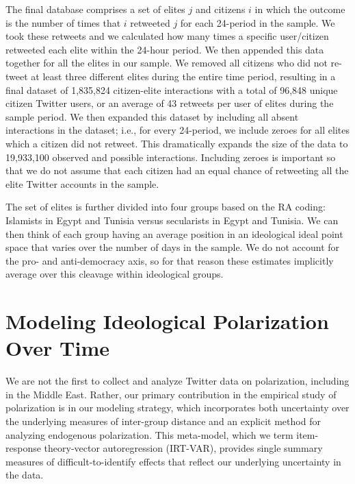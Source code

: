 \documentclass[12pt]{article}
\begin{document}
The final database comprises a set of elites $j$ and citizens $i$ in which the outcome is the number of times that $i$ retweeted $j$ for each 24-period in the sample. We took these retweets and we calculated how many times a specific user/citizen retweeted each elite within the 24-hour period. We then appended this data together for all the elites in our sample. We removed all citizens who did not re-tweet at least three different elites during the entire time period, resulting in a final dataset of 1,835,824 citizen-elite interactions with a total of 96,848 unique citizen Twitter users, or an average of 43 retweets per user of elites during the sample period. We then expanded this dataset by including all absent interactions in the dataset; i.e., for every 24-period, we include zeroes for all elites which a citizen did not retweet. This dramatically expands the size of the data to 19,933,100 observed and possible interactions. Including zeroes is important so that we do not assume that each citizen had an equal chance of retweeting all the elite Twitter accounts in the sample.

The set of elites is further divided into four groups based on the RA coding: Islamists in Egypt and Tunisia versus secularists in Egypt and Tunisia. We can then think of each group having an average position in an ideological ideal point space that varies over the number of days in the sample. We do not account for the pro- and anti-democracy axis, so for that reason these estimates implicitly average over this cleavage within ideological groups.

\section*{Modeling Ideological Polarization Over Time}

We are not the first to collect and analyze Twitter data on polarization, including in the Middle East. Rather, our primary contribution in the empirical study of polarization is in our modeling strategy, which incorporates both uncertainty over the underlying measures of inter-group distance and an explicit method for analyzing endogenous polarization. This meta-model, which we term item-response theory-vector autoregression (IRT-VAR), provides single summary measures of difficult-to-identify effects that reflect our underlying uncertainty in the data.
\end{document}
